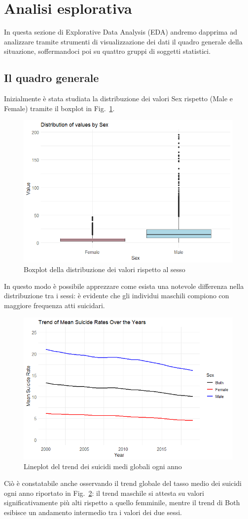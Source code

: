 \documentclass[conference]{IEEEtran}
\begin{document}
\section{Analisi esplorativa}

In questa sezione di Explorative Data Analysis (EDA) andremo dapprima
ad analizzare tramite strumenti di visualizzazione dei dati il quadro generale
della situazione, soffermandoci poi su quattro gruppi di soggetti statistici.

\subsection{Il quadro generale}

Inizialmente è stata studiata la distribuzione dei valori Sex rispetto
(Male e Female) tramite il boxplot in Fig.~\ref{1sex}.
\begin{figure}[htbp]
    \centerline{\includegraphics[width=.5\textwidth]{img/1 - Sex2.png}}
    \caption{Boxplot della distribuzione dei valori rispetto al sesso}
    \label{1sex}
\end{figure}
In questo modo è possibile apprezzare come esista una notevole differenza
nella distribuzione tra i sessi: è evidente che gli individui maschili compiono
con maggiore frequenza atti suicidari.

\begin{figure}[htbp]
    \centerline{\includegraphics[width=.5\textwidth]{img/2 - Globtrend2.png}}
    \caption{Lineplot del trend dei suicidi medi globali ogni anno}
    \label{2globtrend}
\end{figure}
Ciò è constatabile anche osservando il trend globale del
tasso medio dei suicidi ogni anno riportato in Fig.~\ref{2globtrend}: il trend maschile
si attesta su valori significativamente più alti rispetto a quello femminile, mentre
il trend di Both esibisce un andamento intermedio tra i valori dei due sessi.
\end{document}

